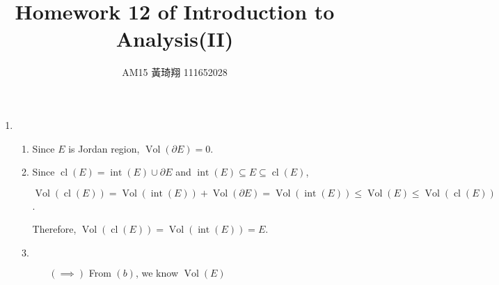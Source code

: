 \documentclass[12pt]{article}
\title{Homework 12 of Introduction to Analysis(II)}
\author{AM15 黃琦翔 111652028}
\DeclareMathOperator{\volumn}{Vol}
\DeclareMathOperator{\interior}{int}
\DeclareMathOperator{\closure}{cl}
\begin{document}
\maketitle
\begin{enumerate}
    \item \begin{enumerate}
        \item Since $E$ is Jordan region, $\volumn(\partial E) = 0$.

        \item Since $\closure(E) = \interior(E) \cup \partial E$ and $\interior(E)\subseteq E \subseteq \closure(E)$,

        $\volumn(\closure(E)) = \volumn(\interior(E)) + \volumn(\partial E) = \volumn(\interior(E))\leq \volumn(E) \leq \volumn(\closure(E))$.

        Therefore, $\volumn(\closure(E)) = \volumn(\interior(E)) = E$.

        \item $\ $
        \begin{enumerate}
            \item[$(\implies)$] From $(b)$, we know $\volumn(E)$
        \end{enumerate}
    \end{enumerate}
\end{enumerate}
\end{document}
